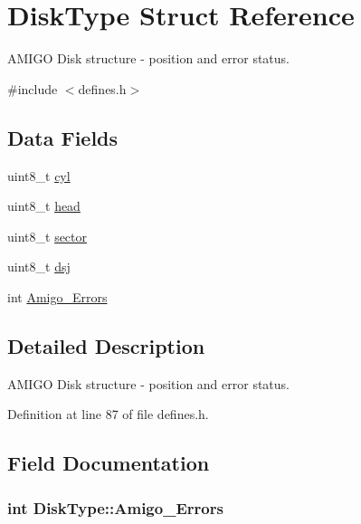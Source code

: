 \hypertarget{structDiskType}{\section{Disk\-Type Struct Reference}
\label{structDiskType}
}


A\-M\-I\-G\-O Disk structure -\/ position and error status.  




{\ttfamily \#include $<$defines.\-h$>$}

\subsection*{Data Fields}
\begin{DoxyCompactItemize}
\item 
uint8\-\_\-t \hyperlink{structDiskType_a990d2a05bc2d8bf1328d0249202539e5}{cyl}
\item 
uint8\-\_\-t \hyperlink{structDiskType_ac4cc3cfd8e1fd4d6ec9dded35384786f}{head}
\item 
uint8\-\_\-t \hyperlink{structDiskType_a6f0a12d4184ccb30a7a5e6e6e713ca85}{sector}
\item 
uint8\-\_\-t \hyperlink{structDiskType_ad89ac2f4b87d861ae4ca3f185868b7da}{dsj}
\item 
int \hyperlink{structDiskType_acb6dbb1b64bfe620430bd235de22292b}{Amigo\-\_\-\-Errors}
\end{DoxyCompactItemize}


\subsection{Detailed Description}
A\-M\-I\-G\-O Disk structure -\/ position and error status. 

Definition at line 87 of file defines.\-h.



\subsection{Field Documentation}
\hypertarget{structDiskType_acb6dbb1b64bfe620430bd235de22292b}{
\subsubsection[{Amigo\-\_\-\-Errors}]{\setlength{\rightskip}{0pt plus 5cm}int Disk\-Type\-::\-Amigo\-\_\-\-Errors}}\label{structDiskType_acb6dbb1b64bfe620430bd235de22292b}


